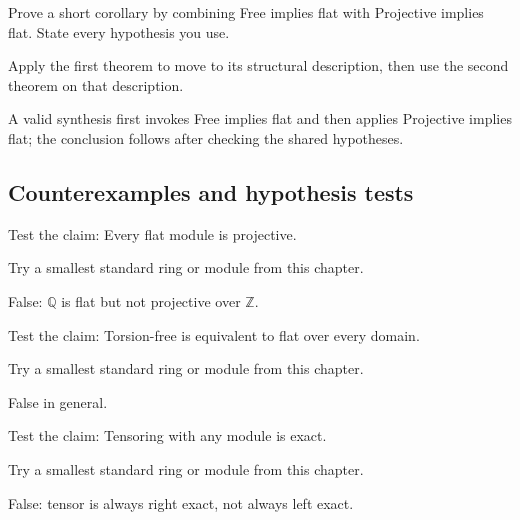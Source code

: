\begin{exercise}\label{exr:v14-expand-09}
Prove a short corollary by combining Free implies flat with Projective implies flat. State every hypothesis you use.
\end{exercise}
\begin{hint}
Apply the first theorem to move to its structural description, then use the second theorem on that description.
\end{hint}
\begin{solution}
A valid synthesis first invokes Free implies flat and then applies Projective implies flat; the conclusion follows after checking the shared hypotheses.
\end{solution}

\subsection*{Counterexamples and hypothesis tests}

\begin{exercise}\label{exr:v14-expand-10}
Test the claim: Every flat module is projective.
\end{exercise}
\begin{hint}
Try a smallest standard ring or module from this chapter.
\end{hint}
\begin{solution}
False: $\mathbb Q$ is flat but not projective over $\mathbb Z$.
\end{solution}

\begin{exercise}\label{exr:v14-expand-11}
Test the claim: Torsion-free is equivalent to flat over every domain.
\end{exercise}
\begin{hint}
Try a smallest standard ring or module from this chapter.
\end{hint}
\begin{solution}
False in general.
\end{solution}

\begin{exercise}\label{exr:v14-expand-12}
Test the claim: Tensoring with any module is exact.
\end{exercise}
\begin{hint}
Try a smallest standard ring or module from this chapter.
\end{hint}
\begin{solution}
False: tensor is always right exact, not always left exact.
\end{solution}

